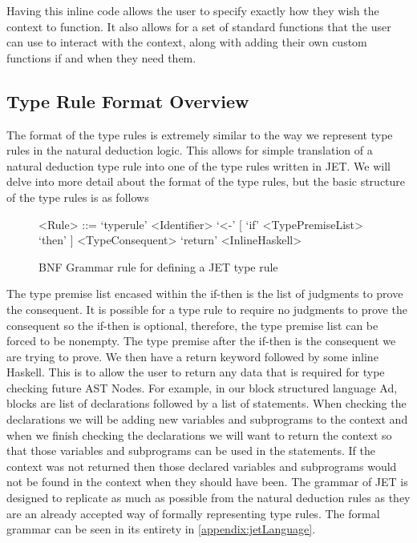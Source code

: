 Having this inline code allows the user to specify exactly how they wish the context to function.
It also allows for a set of standard functions that the user can use to interact with the context, along with adding their own custom functions if and when they need them.

\subsection{Type Rule Format Overview}
\label{sec:typeRuleOverview}
The format of the type rules is extremely similar to the way we represent type rules in the natural deduction logic.
This allows for simple translation of a natural deduction type rule into one of the type rules written in JET.
We will delve into more detail about the format of the type rules, but the basic structure of the type rules is as follows

\begin{figure}[]
    \begin{grammar}
        <Rule> ::= `typerule' <Identifier> `<-' [ `if' <TypePremiseList> `then' ] <TypeConsequent> `return' <InlineHaskell>
    \end{grammar}
    \caption{BNF Grammar rule for defining a JET type rule}
    \label{fig:bnfTypeRuleBasic}
\end{figure}


The type premise list encased within the if-then is the list of judgments to prove the consequent.
It is possible for a type rule to require no judgments to prove the consequent so the if-then is optional, therefore, the type premise list can be forced to be nonempty.
The type premise after the if-then is the consequent we are trying to prove.
We then have a return keyword followed by some inline Haskell.
This is to allow the user to return any data that is required for type checking future AST Nodes.
For example, in our block structured language Ad, blocks are list of declarations followed by a list of statements.
When checking the declarations we will be adding new variables and subprograms to the context and when we finish checking the declarations we will want to return the context so that those variables and subprograms can be used in the statements.
If the context was not returned then those declared variables and subprograms would not be found in the context when they should have been.
The grammar of JET is designed to replicate as much as possible from the natural deduction rules as they are an already accepted way of formally representing type rules.
The formal grammar can be seen in its entirety in \autoref{appendix:jetLanguage}.

